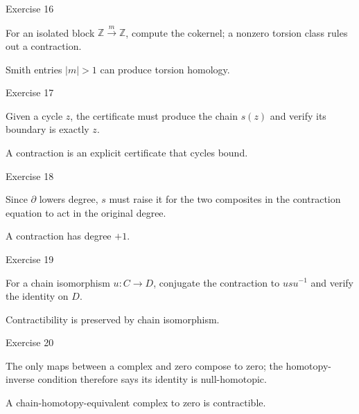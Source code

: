 \begin{exercise}\label{exr:viii23-16}
Exercise 16
\end{exercise}
\begin{hint}
For an isolated block \(\mathbb Z\xrightarrow{m}\mathbb Z\), compute the cokernel; a nonzero torsion class rules out a contraction.
\end{hint}
\begin{solution}
Smith entries \(|m|>1\) can produce torsion homology.
\end{solution}

\begin{exercise}\label{exr:viii23-17}
Exercise 17
\end{exercise}
\begin{hint}
Given a cycle \(z\), the certificate must produce the chain \(s(z)\) and verify its boundary is exactly \(z\).
\end{hint}
\begin{solution}
A contraction is an explicit certificate that cycles bound.
\end{solution}

\begin{exercise}\label{exr:viii23-18}
Exercise 18
\end{exercise}
\begin{hint}
Since \(\partial\) lowers degree, \(s\) must raise it for the two composites in the contraction equation to act in the original degree.
\end{hint}
\begin{solution}
A contraction has degree \(+1\).
\end{solution}

\begin{exercise}\label{exr:viii23-19}
Exercise 19
\end{exercise}
\begin{hint}
For a chain isomorphism \(u:C\to D\), conjugate the contraction to \(usu^{-1}\) and verify the identity on \(D\).
\end{hint}
\begin{solution}
Contractibility is preserved by chain isomorphism.
\end{solution}

\begin{exercise}\label{exr:viii23-20}
Exercise 20
\end{exercise}
\begin{hint}
The only maps between a complex and zero compose to zero; the homotopy-inverse condition therefore says its identity is null-homotopic.
\end{hint}
\begin{solution}
A chain-homotopy-equivalent complex to zero is contractible.
\end{solution}

